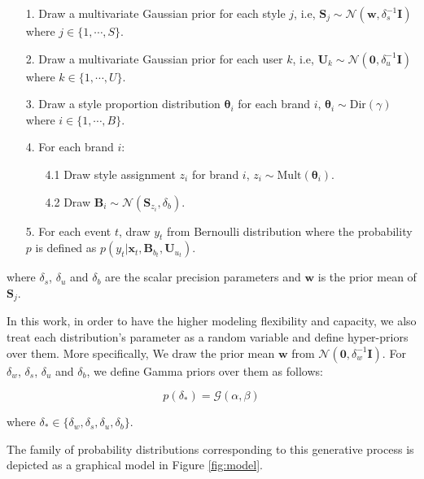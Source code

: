 \begin{enumerate}
\item[1.] Draw a multivariate Gaussian prior for each style $j$, i.e, $\mathbf{S}_j \sim \mathcal{N}(\mathbf{w}, \delta_s^{-1}\mathbf{I})$ where $j \in \{1, \cdots, S\}$.

\item[2.] Draw a multivariate Gaussian prior for each user $k$, i.e, $\mathbf{U}_k \sim \mathcal{N}(\mathbf{0}, \delta_u^{-1}\mathbf{I})$ where $k \in \{1, \cdots, U\}$.

\item[3.] Draw a style proportion distribution $\boldsymbol{\theta}_i$ for each brand $i$, $\boldsymbol{\theta}_i \sim \mbox{Dir}(\gamma)$  where $i \in \{1, \cdots, B\}$.

\item[4.] For each brand $i$:
	\begin{enumerate}
		\item[4.1] Draw style assignment $z_{i}$ for brand $i$, $z_{i} \sim \mbox{Mult}(\boldsymbol{\theta}_i)$.
		\item[4.2] Draw $\mathbf{B}_i \sim \mathcal{N}(\mathbf{S}_{z_i}, \delta_b)$.
	\end{enumerate}

\item[5.] For each event $t$, draw $y_t$ from Bernoulli distribution where the probability $p$ is defined as $p(y_t|\mathbf{x}_t, \mathbf{B}_{b_t}, \mathbf{U}_{u_t})$.
\end{enumerate}

\noindent where $\delta_s$, $\delta_u$ and $\delta_b$ are the scalar precision parameters and $\mathbf{w}$ is the prior mean of $\mathbf{S}_j$. 

In this work, in order to have the higher modeling flexibility and capacity, we also treat each distribution's parameter as a random variable and define hyper-priors over them. More specifically, We draw the prior mean $\mathbf{w}$ from $\mathcal{N}(\mathbf{0}, \delta_w^{-1}\mathbf{I})$. For $\delta_w$, $\delta_s$, $\delta_u$ and $\delta_b$, we define Gamma priors over them as follows: 

\begin{equation}
p(\delta_*) = \mathcal{G}(\alpha, \beta)
\end{equation}

\noindent where $\delta_* \in \{ \delta_w, \delta_s, \delta_u, \delta_b \}$. 

The family of probability distributions corresponding to this generative process is depicted as a graphical model in Figure \ref{fig:model}.

